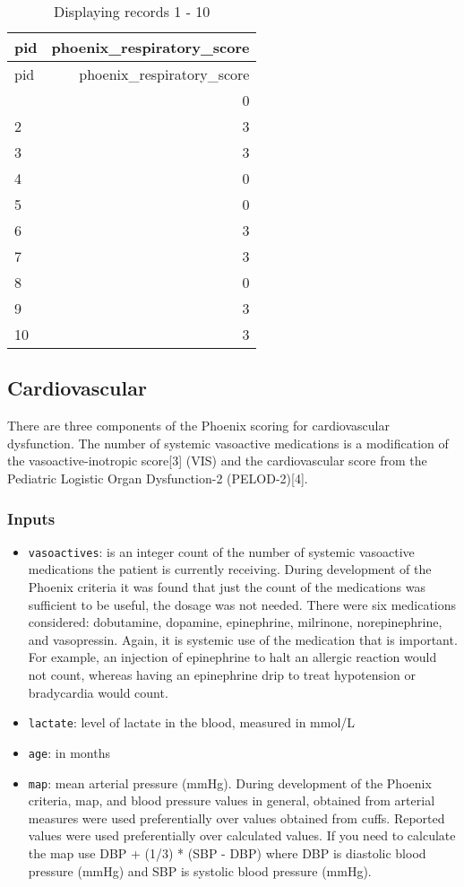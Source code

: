 \documentclass[
  letterpaper,
  DIV=11,
  numbers=noendperiod]{scrartcl}
\begin{document}
\begin{longtable}[]{@{}lr@{}}
\caption{Displaying records 1 - 10}\tabularnewline
\toprule\noalign{}
pid & phoenix\_respiratory\_score \\
\midrule\noalign{}
\endfirsthead
\toprule\noalign{}
pid & phoenix\_respiratory\_score \\
\midrule\noalign{}
\endhead
\bottomrule\noalign{}
\endlastfoot
1 & 0 \\
2 & 3 \\
3 & 3 \\
4 & 0 \\
5 & 0 \\
6 & 3 \\
7 & 3 \\
8 & 0 \\
9 & 3 \\
10 & 3 \\
\end{longtable}

\subsection{Cardiovascular}\label{cardiovascular}

There are three components of the Phoenix scoring for cardiovascular
dysfunction. The number of systemic vasoactive medications is a
modification of the vasoactive-inotropic score{[}3{]} (VIS) and the
cardiovascular score from the Pediatric Logistic Organ Dysfunction-2
(PELOD-2){[}4{]}.

\subsubsection{Inputs}\label{inputs-1}

\begin{itemize}
\item
  \texttt{vasoactives}: is an integer count of the number of systemic
  vasoactive medications the patient is currently receiving. During
  development of the Phoenix criteria it was found that just the count
  of the medications was sufficient to be useful, the dosage was not
  needed. There were six medications considered: dobutamine, dopamine,
  epinephrine, milrinone, norepinephrine, and vasopressin. Again, it is
  systemic use of the medication that is important. For example, an
  injection of epinephrine to halt an allergic reaction would not count,
  whereas having an epinephrine drip to treat hypotension or bradycardia
  would count.
\item
  \texttt{lactate}: level of lactate in the blood, measured in mmol/L
\item
  \texttt{age}: in months
\item
  \texttt{map}: mean arterial pressure (mmHg). During development of the
  Phoenix criteria, map, and blood pressure values in general, obtained
  from arterial measures were used preferentially over values obtained
  from cuffs. Reported values were used preferentially over calculated
  values. If you need to calculate the map use DBP + (1/3) * (SBP - DBP)
  where DBP is diastolic blood pressure (mmHg) and SBP is systolic blood
  pressure (mmHg).
\end{itemize}
\end{document}

